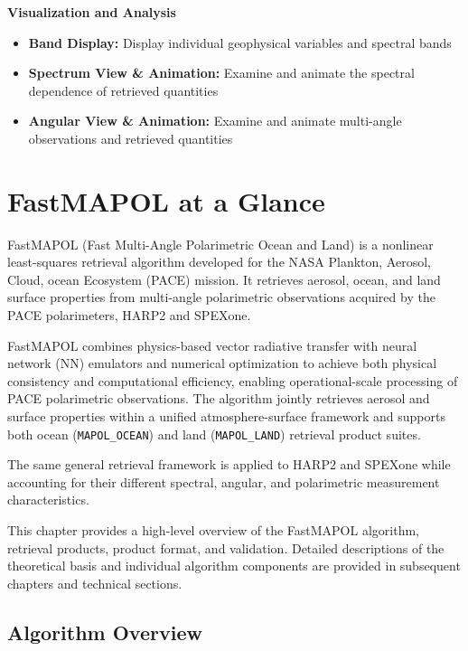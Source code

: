 \documentclass[
  11pt,
  letterpaper,
]{scrreprt}
\providecommand{\tightlist}{%
  \setlength{\itemsep}{0pt}\setlength{\parskip}{0pt}}
\begin{document}
\textbf{Visualization and Analysis}

\begin{itemize}
\tightlist
\item
  \textbf{Band Display:} Display individual geophysical variables and
  spectral bands
\item
  \textbf{Spectrum View \& Animation:} Examine and animate the spectral
  dependence of retrieved quantities
\item
  \textbf{Angular View \& Animation:} Examine and animate multi-angle
  observations and retrieved quantities
\end{itemize}


\chapter{FastMAPOL at a Glance}\label{fastmapol-at-a-glance}

FastMAPOL (Fast Multi-Angle Polarimetric Ocean and Land) is a nonlinear
least-squares retrieval algorithm developed for the NASA Plankton,
Aerosol, Cloud, ocean Ecosystem (PACE) mission. It retrieves aerosol,
ocean, and land surface properties from multi-angle polarimetric
observations acquired by the PACE polarimeters, HARP2 and SPEXone.

FastMAPOL combines physics-based vector radiative transfer with neural
network (NN) emulators and numerical optimization to achieve both
physical consistency and computational efficiency, enabling
operational-scale processing of PACE polarimetric observations. The
algorithm jointly retrieves aerosol and surface properties within a
unified atmosphere-surface framework and supports both ocean
(\texttt{MAPOL\_OCEAN}) and land (\texttt{MAPOL\_LAND}) retrieval
product suites.

The same general retrieval framework is applied to HARP2 and SPEXone
while accounting for their different spectral, angular, and polarimetric
measurement characteristics.

This chapter provides a high-level overview of the FastMAPOL algorithm,
retrieval products, product format, and validation. Detailed
descriptions of the theoretical basis and individual algorithm
components are provided in subsequent chapters and technical sections.

\section{Algorithm Overview}\label{algorithm-overview}
\end{document}
